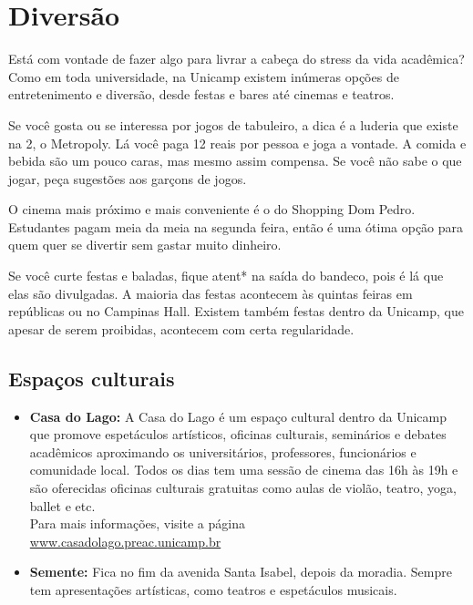 
\section{Diversão}
Está com vontade de fazer algo para livrar a cabeça do stress da vida acadêmica?
Como em toda universidade, na Unicamp existem inúmeras opções de entretenimento
e diversão, desde festas e bares até cinemas e teatros.

Se você gosta ou se interessa por jogos de tabuleiro, a dica é a luderia que
existe na 2, o Metropoly. Lá você paga 12 reais por pessoa e joga a vontade. A
comida e bebida são um pouco caras, mas mesmo assim compensa. Se você não sabe o
que jogar, peça sugestões aos garçons de jogos.

O cinema mais próximo e mais conveniente é o do Shopping Dom Pedro. Estudantes
pagam meia da meia na segunda feira, então é uma ótima opção para quem quer se
divertir sem gastar muito dinheiro.

Se você curte festas e baladas, fique atent* na saída do bandeco, pois é lá que
elas são divulgadas. A maioria das festas acontecem às quintas feiras em
repúblicas ou no Campinas Hall. Existem também festas dentro da Unicamp, que
apesar de serem proibidas, acontecem com certa regularidade.

\subsection{Espaços culturais}

\begin{itemize}
    \item   \textbf{Casa do Lago:} A Casa do Lago é um espaço cultural dentro 
    	da Unicamp que promove espetáculos artísticos, oficinas culturais, 
	seminários e debates acadêmicos aproximando os universitários, professores,
	funcionários e comunidade local. Todos os dias tem uma sessão de cinema 
	das 16h às 19h e são oferecidas oficinas culturais gratuitas como aulas 
	de violão, teatro, yoga, ballet e etc. 
	\\Para mais informações, visite a página 
	\\\url{www.casadolago.preac.unicamp.br}

    \item   \textbf{Semente:} Fica no fim da avenida Santa Isabel, depois da
        moradia. Sempre tem apresentações artísticas, como teatros e espetáculos
        musicais.
\end{itemize}

